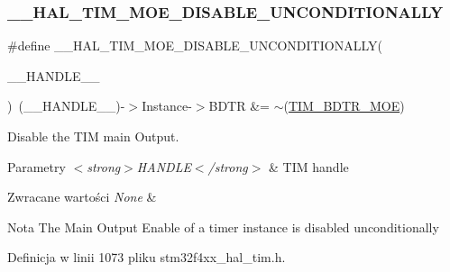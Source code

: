 \subsubsection{\texorpdfstring{\+\_\+\+\_\+\+H\+A\+L\+\_\+\+T\+I\+M\+\_\+\+M\+O\+E\+\_\+\+D\+I\+S\+A\+B\+L\+E\+\_\+\+U\+N\+C\+O\+N\+D\+I\+T\+I\+O\+N\+A\+L\+LY}{\_\_HAL\_TIM\_MOE\_DISABLE\_UNCONDITIONALLY}}
{\footnotesize\ttfamily \#define \+\_\+\+\_\+\+H\+A\+L\+\_\+\+T\+I\+M\+\_\+\+M\+O\+E\+\_\+\+D\+I\+S\+A\+B\+L\+E\+\_\+\+U\+N\+C\+O\+N\+D\+I\+T\+I\+O\+N\+A\+L\+LY(\begin{DoxyParamCaption}\item[{}]{\+\_\+\+\_\+\+H\+A\+N\+D\+L\+E\+\_\+\+\_\+ }\end{DoxyParamCaption})~(\+\_\+\+\_\+\+H\+A\+N\+D\+L\+E\+\_\+\+\_\+)-\/$>$Instance-\/$>$B\+D\+TR \&= $\sim$(\hyperlink{group___peripheral___registers___bits___definition_ga277a096614829feba2d0a4fbb7d3dffc}{T\+I\+M\+\_\+\+B\+D\+T\+R\+\_\+\+M\+OE})}



Disable the T\+IM main Output. 


\begin{DoxyParams}{Parametry}
{\em $<$strong$>$\+H\+A\+N\+D\+L\+E$<$/strong$>$} & T\+IM handle \\
\hline
\end{DoxyParams}

\begin{DoxyRetVals}{Zwracane wartości}
{\em None} & \\
\hline
\end{DoxyRetVals}
\begin{DoxyNote}{Nota}
The Main Output Enable of a timer instance is disabled unconditionally 
\end{DoxyNote}


Definicja w linii 1073 pliku stm32f4xx\+\_\+hal\+\_\+tim.\+h.

\mbox{\label{group___t_i_m___exported___macros_ga04890dcef3ed061854721a3672585607}} 
